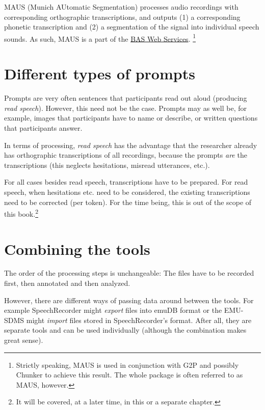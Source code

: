 \documentclass[]{book}
\let\rmarkdownfootnote\footnote%
\def\footnote{\protect\rmarkdownfootnote}
\theoremstyle{definition}
\theoremstyle{definition}
\theoremstyle{definition}
\theoremstyle{remark}
\begin{document}
MAUS (Munich AUtomatic Segmentation) processes audio recordings with
corresponding orthographic transcriptions, and outputs (1) a
corresponding phonetic transcription and (2) a segmentation of the
signal into individual speech sounds. As such, MAUS is a part of the
\href{https://clarin.phonetik.uni-muenchen.de/BASWebServices}{BAS Web
Services}. \footnote{Strictly speaking, MAUS is used in conjunction with
  G2P and possibly Chunker to achieve this result. The whole package is
  often referred to as MAUS, however.}

\section{Different types of prompts}\label{different-types-of-prompts}

Prompts are very often sentences that participants read out aloud
(producing \emph{read speech}). However, this need not be the case.
Prompts may as well be, for example, images that participants have to
name or describe, or written questions that participants answer.

In terms of processing, \emph{read speech} has the advantage that the
researcher already has orthographic transcriptions of all recordings,
because the prompts \emph{are} the transcriptions (this neglects
hesitations, misread utterances, etc.).

For all cases besides read speech, transcriptions have to be prepared.
For read speech, when hesitations etc. need to be considered, the
existing transcriptions need to be corrected (per token). For the time
being, this is out of the scope of this book.\footnote{It will be
  covered, at a later time, in this or a separate chapter.}

\section{Combining the tools}\label{combining-the-tools}

The order of the processing steps is unchangeable: The files have to be
recorded first, then annotated and then analyzed.

However, there are different ways of passing data around between the
tools. For example SpeechRecorder might \emph{export} files into emuDB
format or the EMU-SDMS might \emph{import} files stored in
SpeechRecorder's format. After all, they are separate tools and can be
used individually (although the combination makes great sense).
\end{document}
